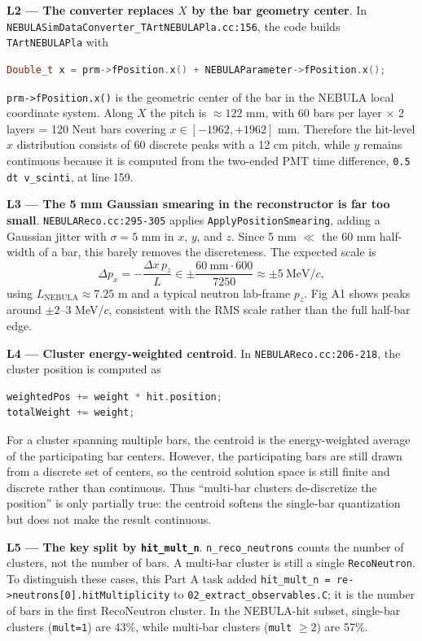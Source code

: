 \documentclass[a4paper,11pt]{article}
\begin{document}
\textbf{L2 --- The converter replaces $X$ by the bar geometry center}. In
\texttt{NEBULASimDataConverter\_TArtNEBULAPla.cc:156}, the code builds
\texttt{TArtNEBULAPla} with
\begin{lstlisting}[language=C++]
Double_t x = prm->fPosition.x() + NEBULAParameter->fPosition.x();
\end{lstlisting}
\texttt{prm->fPosition.x()} is the geometric center of the bar in the NEBULA
local coordinate system. Along $X$ the pitch is $\approx 122$ mm, with
60 bars per layer $\times$ 2 layers = 120 Neut bars covering
$x \in [-1962,+1962]$ mm. Therefore the hit-level $x$ distribution consists of
60 discrete peaks with a 12 cm pitch, while $y$ remains continuous because it is
computed from the two-ended PMT time difference, \texttt{0.5 dt v\_scinti}, at
line 159.

\textbf{L3 --- The 5 mm Gaussian smearing in the reconstructor is far too small}.
\texttt{NEBULAReco.cc:295-305} applies \texttt{ApplyPositionSmearing}, adding a
Gaussian jitter with $\sigma = 5$ mm in $x$, $y$, and $z$. Since
5 mm $\ll$ the 60 mm half-width of a bar, this barely removes the discreteness.
The expected scale is
\[
    \Delta p_x =
    -\frac{\Delta x\,p_z}{L}
    \in
    \pm \frac{60\ \mathrm{mm}\cdot 600}{7250}
    \approx \pm 5\ \mathrm{MeV}/c,
\]
using $L_{\mathrm{NEBULA}} \approx 7.25$ m and a typical neutron lab-frame
$p_z$. Fig A1 shows peaks around $\pm 2$--$3$ MeV/$c$, consistent with the RMS
scale rather than the full half-bar edge.

\textbf{L4 --- Cluster energy-weighted centroid}. In
\texttt{NEBULAReco.cc:206-218}, the cluster position is computed as
\begin{lstlisting}[language=C++]
weightedPos += weight * hit.position;
totalWeight += weight;
\end{lstlisting}
For a cluster spanning multiple bars, the centroid is the energy-weighted average
of the participating bar centers. However, the participating bars are still
drawn from a discrete set of centers, so the centroid solution space is still
finite and discrete rather than continuous. Thus ``multi-bar clusters
de-discretize the position'' is only partially true: the centroid softens the
single-bar quantization but does not make the result continuous.

\textbf{L5 --- The key split by \texttt{hit\_mult\_n}}.
\texttt{n\_reco\_neutrons} counts the number of clusters, not the number of bars.
A multi-bar cluster is still a single \texttt{RecoNeutron}. To distinguish these
cases, this Part A task added
\texttt{hit\_mult\_n = re->neutrons[0].hitMultiplicity} to
\texttt{02\_extract\_observables.C}; it is the number of bars in the first
RecoNeutron cluster. In the NEBULA-hit subset, single-bar clusters
(\texttt{mult=1}) are 43\%, while multi-bar clusters (\texttt{mult} $\geq 2$)
are 57\%.
\end{document}
